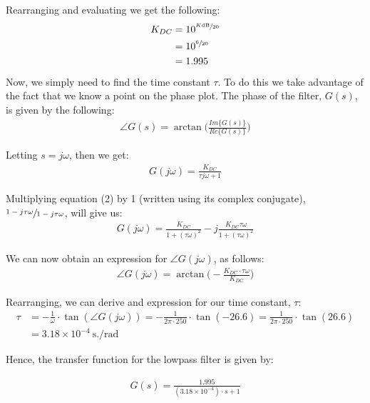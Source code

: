 \documentclass{article}
\begin{document}
    Rearranging and evaluating we get the following:
    \begin{align*}
	    K_{DC} 	&= 10^{\sfrac{K\si{\decibel}}{20}}\\
			    &= 10^{\sfrac{6}{20}}\\
			    &= 1.995
    \end{align*}
    
    Now, we simply need to find the time constant $\tau$. To do this we take advantage of the fact that we know a point on the phase plot. The phase of the filter, $G(s)$, is given by the following:
    \begin{align*}
	    \angle G(s) = \arctan \bigg(\frac{Im\{G(s)\}}{Re\{G(s)\}}\bigg)
    \end{align*}
	
	Letting $s = j \omega$, then we get:
	\begin{align}
	G(j \omega) = \frac{K_{DC}}{\tau j \omega +1}
	\end{align}
	
	Multiplying equation (2) by 1 (written using its complex conjugate), $\sfrac{1 - j \tau \omega}{1 - j \tau \omega}$, will give us:
	\begin{align*}
		G(j \omega) = \frac{K_{DC}}{1+(\tau \omega)^2} - j\frac{K_{DC} \tau \omega}{1+(\tau \omega)^2}
	\end{align*}
	
	We can now obtain an expression for $\angle G(j \omega)$, as follows:
	\begin{align*}
		\angle G(j \omega) = \arctan \bigg(-\frac{K_{DC} \cdot \tau \omega}{K_{DC}}\bigg)
	\end{align*}
	
	Rearranging, we can derive and expression for our time constant, $\tau$:
	\begin{align*}
		\tau 	&= -\frac{1}{\omega} \cdot \tan (\angle G(j \omega)) = -\frac{1}{2 \pi \cdot 250} \cdot \tan (-26.6) = \frac{1}{2 \pi \cdot 250} \cdot \tan (26.6)\\
				&= 3.18 \times 10^{-4} \ \si{\second.\per\radian}
	\end{align*}
	
	Hence, the transfer function for the lowpass filter is given by:
	
	\begin{align}
		G(s) = \frac{1.995}{(3.18 \times 10^{-4}) \cdot s + 1}
	\end{align}



\end{document}
